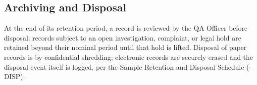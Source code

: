\subsection{Archiving and Disposal}

At the end of its retention period, a record is reviewed by the QA Officer before disposal;
records subject to an open investigation, complaint, or legal hold are retained beyond their
nominal period until that hold is lifted. Disposal of paper records is by confidential
shredding; electronic records are securely erased and the disposal event itself is logged,
per the Sample Retention and Disposal Schedule (\doccode-DISP).
